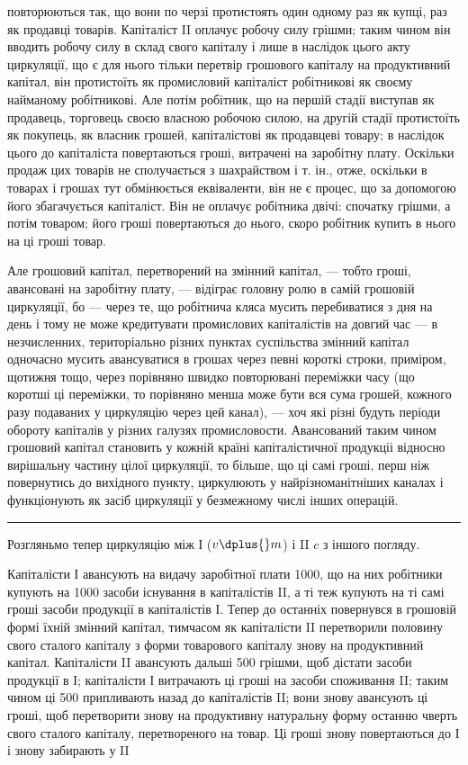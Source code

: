 \parcont{}  %
повторюються так, що вони по черзі протистоять один одному раз як
купці, раз як продавці товарів. Капіталіст II оплачує робочу силу грішми;
таким чином він вводить робочу силу в склад свого капіталу і лише
в наслідок цього акту циркуляції, що є для нього тільки перетвір грошового
капіталу на продуктивний капітал, він протистоїть як промисловий
капіталіст робітникові як своєму найманому робітникові. Але
потім робітник, що на першій стадії виступав як продавець, торговець
своєю власною робочою силою, на другій стадії протистоїть як покупець,
як власник грошей, капіталістові як продавцеві товару; в наслідок цього
до капіталіста повертаються гроші, витрачені на заробітну плату. Оскільки
продаж цих товарів не сполучається з шахрайством і т. ін., отже,
оскільки в товарах і грошах тут обмінюється еквіваленти, він не є процес,
що за допомогою його збагачується капіталіст. Він не оплачує
робітника двічі: спочатку грішми, а потім товаром; його гроші повертаються
до нього, скоро робітник купить в нього на ці гроші товар.

Але грошовий капітал, перетворений на змінний капітал, — тобто гроші,
авансовані на заробітну плату, — відіграє головну ролю в самій грошовій
циркуляції, бо — через те, що робітнича кляса мусить перебиватися з
дня на день і тому не може кредитувати промислових капіталістів на
довгий час — в незчисленних, територіально різних пунктах суспільства
змінний капітал одночасно мусить авансуватися в грошах через певні
короткі строки, приміром, щотижня тощо, через порівняно швидко
повторювані переміжки часу (що коротші ці переміжки, то порівняно
менша може бути вся сума грошей, кожного разу подаваних у
циркуляцію через цей канал), — хоч які різні будуть періоди обороту
капіталів у різних галузях промисловости. Авансований таким чином грошовий
капітал становить у кожній країні капіталістичної продукціі відносно
вирішальну частину цілої циркуляції, то більше, що ці самі гроші,
перш ніж повернутись до вихідного пункту, циркулюють у найрізноманітніших
каналах і функціонують як засіб циркуляції у безмежному числі
інших операцій.
\pfbreak
Розгляньмо тепер циркуляцію між І ($v \dplus{} m$) і II $c$ з іншого погляду.

Капіталісти І авансують на видачу заробітної плати 1000,
що на них робітники купують на 1000 засоби існування в капіталістів
II, а ті теж купують на ті самі гроші засоби продукції в капіталістів
І. Тепер до останніх повернувся в грошовій формі їхній змінний
капітал, тимчасом як капіталісти II перетворили половину свого сталого
капіталу з форми товарового капіталу знову на продуктивний капітал.
Капіталісти II авансують дальші 500 грішми, щоб дістати засоби
продукції в І; капіталісти І витрачають ці гроші на засоби споживання
II; таким чином ці 500 припливають назад до капіталістів II;
вони знову авансують ці гроші, щоб перетворити знову на продуктивну
натуральну форму останню чверть свого сталого капіталу, перетвореного
на товар. Ці гроші знову повертаються до І і знову забирають у II
\parbreak{}  %
